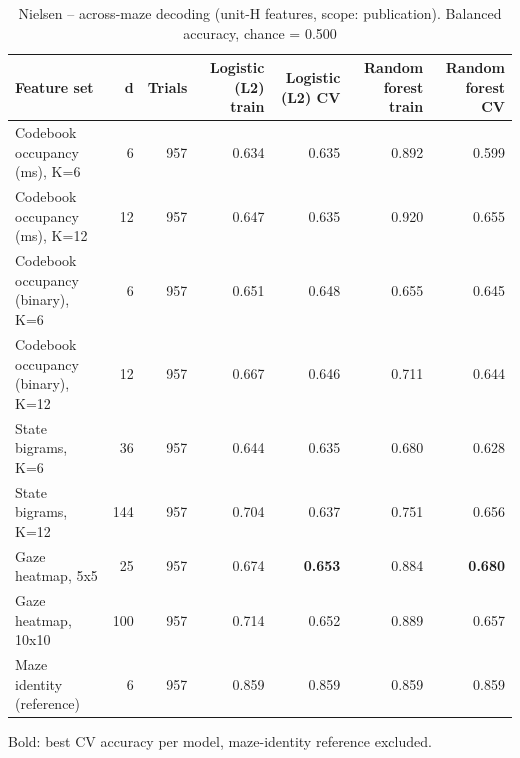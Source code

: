 \begin{table}[t]
\centering
\caption{Nielsen -- across-maze decoding (unit-H features, scope: publication). Balanced accuracy, chance = 0.500}
\label{tab:crossmaze_Nielsen}
\begin{tabular}{lrrrrrr}
\toprule
Feature set & d & Trials & Logistic (L2) train & Logistic (L2) CV & Random forest train & Random forest CV \\
\midrule
Codebook occupancy (ms), K=6 & 6 & 957 & 0.634 & 0.635 & 0.892 & 0.599 \\
Codebook occupancy (ms), K=12 & 12 & 957 & 0.647 & 0.635 & 0.920 & 0.655 \\
Codebook occupancy (binary), K=6 & 6 & 957 & 0.651 & 0.648 & 0.655 & 0.645 \\
Codebook occupancy (binary), K=12 & 12 & 957 & 0.667 & 0.646 & 0.711 & 0.644 \\
State bigrams, K=6 & 36 & 957 & 0.644 & 0.635 & 0.680 & 0.628 \\
State bigrams, K=12 & 144 & 957 & 0.704 & 0.637 & 0.751 & 0.656 \\
Gaze heatmap, 5x5 & 25 & 957 & 0.674 & \textbf{0.653} & 0.884 & \textbf{0.680} \\
Gaze heatmap, 10x10 & 100 & 957 & 0.714 & 0.652 & 0.889 & 0.657 \\
Maze identity (reference) & 6 & 957 & 0.859 & 0.859 & 0.859 & 0.859 \\
\bottomrule
\end{tabular}
\par\smallskip
{\footnotesize Bold: best CV accuracy per model, maze-identity reference excluded.}
\end{table}
